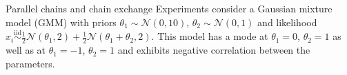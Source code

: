 \documentclass[final]{beamer}
\newlength{\onecolwid}
\newlength{\twocolwid}
\begin{document}
\begin{frame}[t]
\begin{columns}[t]
\begin{column}{\twocolwid}
\begin{columns}[t,totalwidth=\twocolwid] %

\begin{column}{\onecolwid}\vspace{-.6in} %


\begin{block}{Parallel chains and chain exchange}
  Experiments consider a Gaussian mixture model (GMM) with
  priors $\theta_1 \sim \mathcal{N}(0,10)$, $\theta_2 \sim \mathcal{N}(0,1)$
  and likelihood
  $x_i \overset{\text{iid}}{\sim} \frac{1}{2}\mathcal{N}(\theta_1, 2) + \frac{1}{2}\mathcal{N}(\theta_1 + \theta_2, 2)$.
  This model has a mode at $\theta_1 = 0$, $\theta_2 = 1$ as well as at
  $\theta_1 = -1$, $\theta_2 = 1$ and exhibits negative correlation
  between the parameters.


\end{block}
\end{column}
\end{columns}
\end{column}
\end{columns}
\end{frame}
\end{document}
